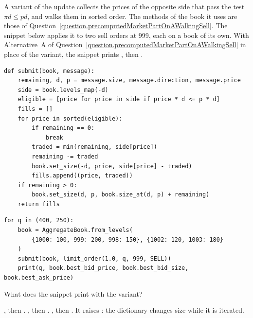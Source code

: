 \begin{question}
\label{question.eligibleBidsWalkedFromTheLowest}
A variant of the update collects the prices of the opposite side
that pass the test $\pi d \leq p d$,
and walks them in sorted order.
The methods of the book it uses are those of
Question~\ref{question.precomputedMarketPartOnAWalkingSell}.
The snippet below applies it to two sell orders at 999, each on a book of its own.
With Alternative~A of Question~\ref{question.precomputedMarketPartOnAWalkingSell}
in place of the variant,
the snippet prints , then .
\begin{lstlisting}[caption={A variant of the update}, label=listing.eligibleBidsWalkedFromTheLowestVariant]
def submit(book, message):
    remaining, d, p = message.size, message.direction, message.price
    side = book.levels_map(-d)
    eligible = [price for price in side if price * d <= p * d]
    fills = []
    for price in sorted(eligible):
        if remaining == 0:
            break
        traded = min(remaining, side[price])
        remaining -= traded
        book.set_size(-d, price, side[price] - traded)
        fills.append((price, traded))
    if remaining > 0:
        book.set_size(d, p, book.size_at(d, p) + remaining)
    return fills
\end{lstlisting}
\begin{lstlisting}[caption={Two sell orders at 999}, label=listing.eligibleBidsWalkedFromTheLowestRun]
for q in (400, 250):
    book = AggregateBook.from_levels(
        {1000: 100, 999: 200, 998: 150}, {1002: 120, 1003: 180}
    )
    submit(book, limit_order(1.0, q, 999, SELL))
    print(q, book.best_bid_price, book.best_bid_size, book.best_ask_price)
\end{lstlisting}
What does the snippet print with the variant?
\begin{choices}
 \choice {}, then .
 \correctchoice {}, then .
 \choice {}, then .
 \choice It raises : the dictionary changes size while it is iterated.
\end{choices}
\end{question}

